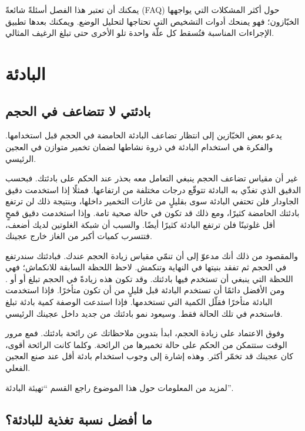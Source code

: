 \begin{quoting}
يمكنك أن تعتبر هذا الفصل أسئلةً شائعةً \textenglish{(FAQ)} حول أكثر المشكلات التي يواجهها الخبّازون؛ فهو يمنحك أدوات التشخيص التي تحتاجها لتحليل الوضع. ويمكنك بعدها تطبيق الإجراءات المناسبة فتُسقط كل علّة واحدة تلو الأخرى حتى تبلغ الرغيف المثالي.
\end{quoting}

\section{البادئة}

\subsection{بادئتي لا تتضاعف في الحجم}

يدعو بعض الخبّازين إلى انتظار تضاعف البادئة الحامضة في الحجم قبل استخدامها. والفكرة هي استخدام البادئة في ذروة نشاطها لضمان تخمير متوازن في العجين الرئيسي.

غير أن مقياس تضاعف الحجم ينبغي التعامل معه بحذر عند الحكم على بادئتك. فبحسب الدقيق الذي تغذّي به البادئة تتوقّع درجات مختلفة من ارتفاعها. فمثلًا إذا استخدمت دقيق الجاودار فلن تحتفي البادئة سوى بقليلٍ من غازات التخمير داخلها، وبنتيجة ذلك لن ترتفع بادئتك الحامضة كثيرًا، ومع ذلك قد تكون في حالة صحية تامة. وإذا استخدمت دقيق قمحٍ أقل غلوتينًا فلن ترتفع البادئة كثيرًا أيضًا. والسبب أن شبكة الغلوتين لديك أضعف، فتتسرب كميات أكبر من الغاز خارج عجينك.

والمقصود من ذلك أنك مدعوّ إلى أن تنمّي مقياس زيادة الحجم عندك. فبادئتك سندرتفع في الحجم ثم تفقد بنيتها في النهاية وتنكمش. لاحظ اللحظة السابقة للانكماش؛ فهي اللحظة التي ينبغي أن تستخدم فيها بادئتك. وقد تكون هذه زيادةً في الحجم تبلغ  أو  أو . ومن الأفضل دائمًا أن تستخدم البادئة قبل قليلٍ من أن تكون متأخرًا. فإذا استخدمت البادئة متأخرًا فقلّل الكمية التي تستخدمها. فإذا استدعت الوصفة كمية بادئة تبلغ  فاستخدم في تلك الحالة  فقط. وسيعود نمو بادئتك من جديد داخل عجينك الرئيسي.

وفوق الاعتماد على زيادة الحجم، ابدأ بتدوين ملاحظاتك عن رائحة بادئتك. فمع مرور الوقت ستتمكن من الحكم على حالة تخميرها من الرائحة. وكلما كانت الرائحة أقوى، كان عجينك قد تخمّر أكثر. وهذه إشارة إلى وجوب استخدام بادئة أقل عند صنع العجين الفعلي.

لمزيد من المعلومات حول هذا الموضوع راجع القسم  ``تهيئة البادئة''.

\subsection{ما أفضل نسبة تغذية للبادئة؟}

